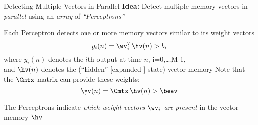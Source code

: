 \begin{slide}[\slideopts,toc={Perceptrons}]{Detecting Multiple Vectors in Parallel}
\maybepause
\vspace{1em}
\textbf{Idea:} Detect multiple memory vectors in \emph{parallel} using an \emph{array} of \emph{``Perceptrons''}
\begin{itemize}
  \mpitem Each Perceptron detects one or more memory vectors similar to its weight vectors
  \[
  y_i(n) = \wv_i^T\hv(n) > b_i
  \]
  where $y_i(n)$ denotes the $i$th output at time $n$, i=0,\ldots,M-1,\\
  and $\hv(n)$ denotes the (``hidden'' [expanded-] state) vector memory
  \mpitem Note that the $\Cmtx$ matrix can provide these weights:
  \[
  \yv(n) = \Cmtx\,\hv(n) > \beev
  \]

\mpitem The Perceptrons indicate \emph{which weight-vectors $\wv_i$ are present} in the vector memory $\hv$

\end{itemize}

\end{slide}



